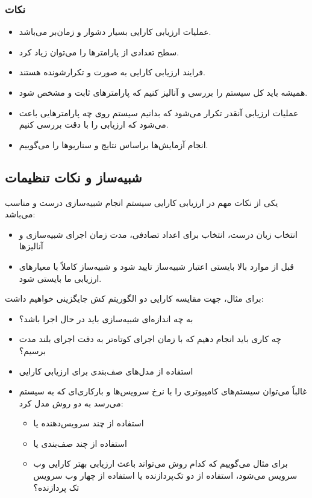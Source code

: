 \subsubsection*{نکات}

\begin{itemize}
    \item عملیات ارزیابی کارایی بسیار دشوار و زمان‌بر می‌باشد.
    \item سطح تعدادی از پارامتر‌ها را می‌توان زیاد کرد.
    \item فرایند ارزیابی کارایی به صورت  و تکرارشونده هستند.
    \item همیشه باید کل سیستم را بررسی و آنالیز کنیم که پارامتر‌های ثابت و
     مشخص شود.
    \item عملیات ارزیابی آنقدر تکرار می‌شود که بدانیم سیستم روی چه پارامتر‌هایی
    باعث می‌شود که ارزیابی را با دقت بررسی کنیم.
    \item انجام آزمایش‌ها براساس نتایج و سناریو‌ها را  می‌گوییم.
\end{itemize}

\subsection{شبیه‌ساز و نکات تنظیمات}

یکی از نکات مهم در ارزیابی کارایی سیستم انجام شبیه‌سازی درست و مناسب می‌باشد:

\begin{itemize}
    \item انتخاب زبان درست، انتخاب  برای اعداد تصادفی، مدت زمان اجرای
    شبیه‌سازی و آنالیز‌ها
    \item قبل از موارد بالا بایستی اعتبار شبیه‌ساز تایید شود و شبیه‌ساز کاملاً
    با معیار‌های ارزیابی ما بایستی  شود.
\end{itemize}

برای مثال، جهت مقایسه کارایی دو الگوریتم کش جایگزینی خواهیم داشت:

\begin{itemize}
    \item به چه اندازه‌ای شبیه‌سازی باید در حال اجرا باشد؟
    \item چه کاری باید انجام دهیم که با زمان اجرای کوتاه‌تر به دقت اجرای بلند
    مدت برسیم؟
    \item استفاده از مدل‌های صف‌بندی برای ارزیابی کارایی
    \item غالباً می‌توان سیستم‌های کامپیوتری را با نرخ سرویس‌ها و بارکاری‌ای که
    به سیستم می‌رسد به دو روش مدل کرد:
    \begin{itemize}
        \item استفاده از چند سرویس‌دهنده یا 
        \item استفاده از چند صف‌بندی یا 
        \item برای مثال می‌گوییم که کدام روش می‌تواند باعث ارزیابی بهتر کارایی
        وب سرویس می‌شود، استفاده از دو تک‌پردازنده یا استفاده از چهار وب سرویس
        تک پردازنده؟
    \end{itemize}
\end{itemize}

